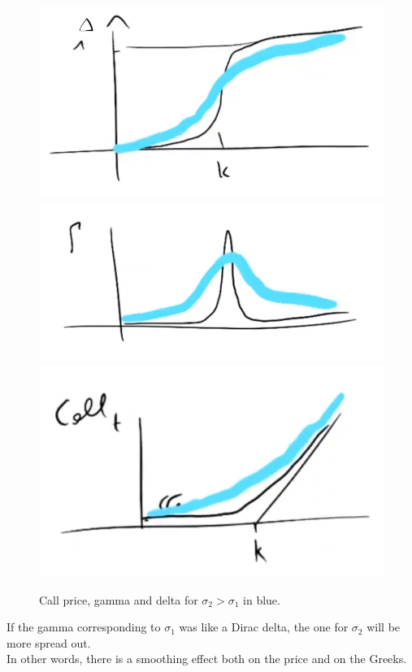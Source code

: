 \begin{figure}[htp]
    \centering
    \includegraphics[scale=0.3]{fig/tmp/fig21.png}
    \includegraphics[scale=0.3]{fig/tmp/fig22.png}
    \includegraphics[scale=0.3]{fig/tmp/fig20.png}
    \caption{Call price, gamma and delta for $\sigma_2>\sigma_1$ in blue.}
    \label{fig:call2}
\end{figure}
If the gamma corresponding to $\sigma_1$ was like a Dirac delta, the one for $\sigma_2$ will be more spread out.\\
In other words, there is a smoothing effect both on the price and on the Greeks.

